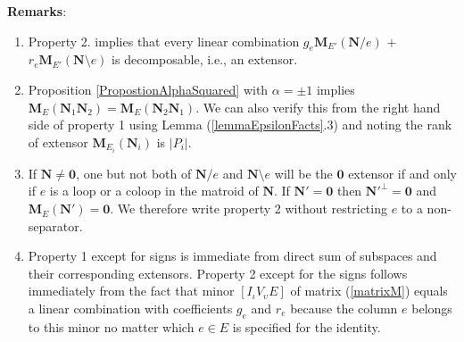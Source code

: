 \documentclass[12pt]{article}
\theoremstyle{definition}
\newcommand{\Remarks}{\textbf{Remarks}}
\newcommand{\Is}{\ensuremath{\iota}}
\newcommand{\Vs}{\ensuremath{\upsilon}}
\newcommand{\Card}[1]{\ensuremath{{\left|#1\right|}}}
\newcommand{\ext}[1]{\ensuremath{\mathbf{#1}}}
\begin{document}
\Remarks:  
\begin{enumerate}
\item 
Property 2. implies that every
linear combination $g_e\ext{M}_{E'}(\ext{N}/e)$ $+$
$r_e\ext{M}_{E'}(\ext{N}\setminus e)$ is decomposable, i.e., an 
extensor.
\item Proposition \ref{PropostionAlphaSquared} with $\alpha=\pm 1$
implies $\ext{M}_E(\ext{N}_1\ext{N}_2)=\ext{M}_E(\ext{N}_2\ext{N}_1)$.  
We can also verify this from the right hand side of 
property 1 using Lemma (\ref{lemmaEpsilonFacts}.3) and noting the rank of
extensor $\ext{M}_{E_i}(\ext{N}_i)$ is $\Card{P_i}$.
\item
If $\ext{N}\neq \ext{0}$, 
one but not both of $\ext{N}/e$ and $\ext{N}\setminus e$ 
will
be the $\ext{0}$ extensor 
if and only if $e$ is a loop or a coloop in the matroid of $\ext{N}$.
If $\ext{N}'=\ext{0}$ then $\ext{N}'^{\perp}=\ext{0}$ and 
$\ext{M}_E(\ext{N}')=\ext{0}$.
We therefore write property 2 without restricting $e$ to a non-separator.
\item Property 1 except for signs is immediate from direct sum of 
subspaces and their corresponding extensors.  Property 2 except for the
signs
follows immediately 
from the fact that minor $[I_{\Is}V_{\Vs}E]$ of matrix (\ref{matrixM})
equals a linear combination with coefficients $g_e$ and $r_e$
because 
the column $e$ belongs to this minor
no matter which $e\in E$ is specified 
for the identity.
\end{enumerate}
\end{document}
